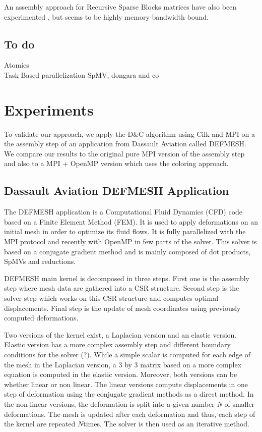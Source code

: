\documentclass{IOS-Book-Article}
\begin{document}
An assembly approach for Recursive Sparse Blocks matrices have also been experimented \cite{RSBasm}, but seems to be highly memory-bandwidth bound.

\subsection{To do}
Atomics\\
Task Based parallelization SpMV, dongara and co \cite{MPI_task}\\

\section{Experiments}
To validate our approach, we apply the D\&C algorithm using Cilk and MPI on a the assembly step of an application from Dassault Aviation called DEFMESH.
We compare our results to the original pure MPI version of the assembly step and also to a MPI + OpenMP version which uses the coloring approach.

\subsection{Dassault Aviation DEFMESH Application}
The DEFMESH application is a Computational Fluid Dynamics (CFD) code based on a Finite Element Method (FEM).
It is used to apply deformations on an initial mesh in order to optimize its fluid flows.
It is fully parallelized with the MPI protocol and recently with OpenMP in few parts of the solver.
This solver is based on a conjugate gradient method and is mainly composed of dot products, SpMVs and reductions.

DEFMESH main kernel is decomposed in three steps.
First one is the assembly step where mesh data are gathered into a CSR structure.
Second step is the solver step which works on this CSR structure and computes optimal displacements.
Final step is the update of mesh coordinates using previously computed deformations.

Two versions of the kernel exist, a Laplacian version and an elastic version. Elastic version has a more complex assembly step and different boundary conditions for the solver (?).
While a simple scalar is computed for each edge of the mesh in the Laplacian version, a 3 by 3 matrix based on a more complex equation is computed in the elastic version.
Moreover, both versions can be whether linear or non linear.
The linear versions compute displacements in one step of deformation using the conjugate gradient methods as a direct method.
In the non linear versions, the deformation is split into a given number \emph{N} of smaller deformations.
The mesh is updated after each deformation and thus, each step of the kernel are repeated $N$times. The solver is then used as an iterative method.
\end{document}
